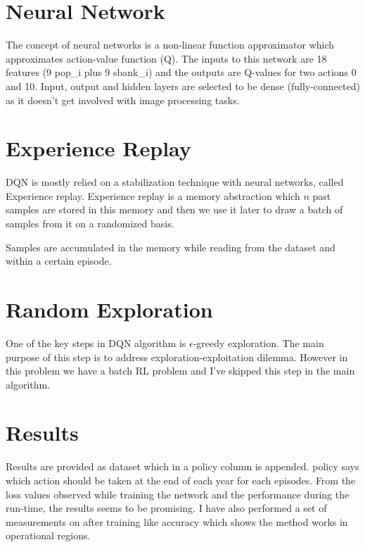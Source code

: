 \documentclass[12pt]{report}
\begin{document}
\section{Neural Network}
The concept of neural networks is a non-linear function approximator \cite{Bengio2009} which approximates action-value function (Q). The inputs to this network are 18 features (9 pop\_i plus 9 sbank\_i) and the outputs are Q-values for two actions 0 and 10. Input, output and hidden layers are selected to be dense (fully-connected) as it doesn't get involved with image processing tasks.

\section{Experience Replay}
DQN is mostly relied on a stabilization technique with neural networks, called Experience replay. Experience replay is a memory abstraction which $n$ past samples are stored in this memory and then we use it later to draw a batch of samples from it on a randomized basis.

Samples are accumulated in the memory while reading from the dataset and within a certain episode.


\section{Random Exploration}
One of the key steps in DQN algorithm is $\epsilon$-greedy exploration. The main purpose of this step is to address exploration-exploitation dilemma. However in this problem we have a batch RL problem and I've skipped this step in the main algorithm.

\section{Results}
Results are provided as dataset which in a policy column is appended. policy says which action should be taken at the end of each year for each episodes. From the loss values observed while training the network and the performance during the run-time, the results seems to be promising. I have also performed a set of measurements on after training like accuracy which shows the method works in operational regions.




\end{document}
